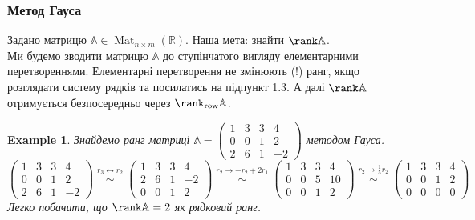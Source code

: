 \documentclass[a4paper, 10pt]{article}
\theoremstyle{theoremdd}
\newtheorem{example}[theorem]{Example}
\DeclareMathOperator{\Mat}{Mat}
\begin{document}
\subsubsection*{Метод Гауса}
Задано матрицю $\mathbb{A} \in \Mat_{n \times m}(\mathbb{R})$. Наша мета: знайти $\rank \mathbb{A}$.\\
Ми будемо зводити матрицю $\mathbb{A}$ до ступінчатого вигляду елементарними перетвореннями. Елементарні перетворення не змінюють (!) ранг, якщо розглядати систему рядків та посилатись на підпункт 1.3. А далі $\rank \mathbb{A}$ отримується безпосередньо через $\rank_{\textrm{row}} \mathbb{A}$.
\begin{example}
Знайдемо ранг матриці $\mathbb{A} = \begin{pmatrix}
1 & 3 & 3 & 4 \\
0 & 0 & 1 & 2 \\
2 & 6 & 1 & -2
\end{pmatrix}$ методом Гауса.\\
$\begin{pmatrix}
1 & 3 & 3 & 4 \\
0 & 0 & 1 & 2 \\
2 & 6 & 1 & -2
\end{pmatrix} \overset{\substack{r_3 \leftrightarrow r_2}}{\sim} \begin{pmatrix}
1 & 3 & 3 & 4 \\
2 & 6 & 1 & -2 \\
0 & 0 & 1 & 2
\end{pmatrix} \overset{\substack{r_2 \to -r_2 + 2r_1}}{\sim} \begin{pmatrix}
1 & 3 & 3 & 4 \\
0 & 0 & 5 & 10 \\
0 & 0 & 1 & 2
\end{pmatrix} \overset{\substack{r_2 \to \frac{1}{5}r_2}}{\sim} \begin{pmatrix}
1 & 3 & 3 & 4 \\
0 & 0 & 1 & 2 \\
0 & 0 & 0 & 0
\end{pmatrix}$\\
Легко побачити, що $\rank \mathbb{A} = 2$ як рядковий ранг.
\end{example}
\end{document}
